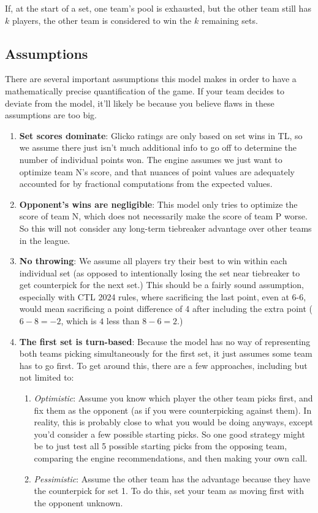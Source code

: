 \documentclass[12pt]{article}
\begin{document}
			If, at the start of a set, one team's pool is exhausted, but the other team still has $k$ players, the other team is considered to win the $k$ remaining sets.
	
		\subsection{Assumptions}
			There are several important assumptions this model makes in order to have a mathematically precise quantification of the game. If your team decides to deviate from the model, it’ll likely be because you believe flaws in these assumptions are too big.
			\begin{enumerate}
				\item \textbf{Set scores dominate}: Glicko ratings are only based on set wins in TL, so we assume there just isn’t much additional info to go off to determine the number of individual points won. The engine assumes we just want to optimize team N's score, and that nuances of point values are adequately accounted for by fractional computations from the expected values.
				\item \textbf{Opponent's wins are negligible}: This model only tries to optimize the score of team N, which does not necessarily make the score of team P worse. So this will not consider any long-term tiebreaker advantage over other teams in the league.
				\item \textbf{No throwing}: We assume all players try their best to win within each individual set (as opposed to intentionally losing the set near tiebreaker to get counterpick for the next set.) This should be a fairly sound assumption, especially with CTL 2024 rules, where sacrificing the last point, even at 6-6, would mean sacrificing a point difference of 4 after including the extra point ($6 - 8 = -2$, which is $4$ less than $8 - 6 = 2$.)
				\item \textbf{The first set is turn-based}: Because the model has no way of representing both teams picking simultaneously for the first set, it just assumes some team has to go first. To get around this, there are a few approaches, including but not limited to:
				\begin{enumerate}
					\item \textit{Optimistic}: Assume you know which player the other team picks first, and fix them as the opponent (as if you were counterpicking against them). In reality, this is probably close to what you would be doing anyways, except you’d consider a few possible starting picks. So one good strategy might be to just test all 5 possible starting picks from the opposing team, comparing the engine recommendations, and then making your own call.
					\item \textit{Pessimistic}: Assume the other team has the advantage because they have the counterpick for set 1. To do this, set your team as moving first with the opponent unknown.
				\end{enumerate}
			\end{enumerate}
		
\end{document}
